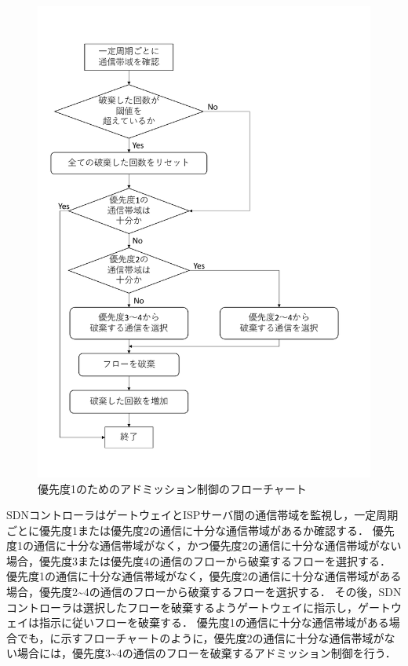 \documentclass[a4paper,11pt,uplatex]{ujreport}
\begin{document}
  \begin{figure}[!tb]
    \centering
    \includegraphics[width=\linewidth]{img/adomission2.pdf}
    \caption{優先度1のためのアドミッション制御のフローチャート}
    \label{fig:adomission}
  \end{figure}

  SDNコントローラはゲートウェイとISPサーバ間の通信帯域を監視し，一定周期ごとに優先度1または優先度2の通信に十分な通信帯域があるか確認する．
  優先度1の通信に十分な通信帯域がなく，かつ優先度2の通信に十分な通信帯域がない場合，優先度3または優先度4の通信のフローから破棄するフローを選択する．
  優先度1の通信に十分な通信帯域がなく，優先度2の通信に十分な通信帯域がある場合，優先度2\textasciitilde4の通信のフローから破棄するフローを選択する．
  その後，SDNコントローラは選択したフローを破棄するようゲートウェイに指示し，ゲートウェイは指示に従いフローを破棄する．
  優先度1の通信に十分な通信帯域がある場合でも，に示すフローチャートのように，優先度2の通信に十分な通信帯域がない場合には，優先度3\textasciitilde4の通信のフローを破棄するアドミッション制御を行う．\par
\end{document}
